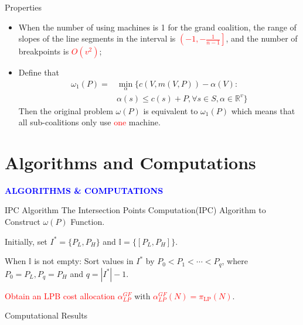 \documentclass[14pt]{beamer}
\begin{document}
\begin{frame}{Properties}
	\vspace{-1mm}
		\begin{itemize}
		\justifying
			\item When the number of using machines is 1 for the grand coalition, the range of slopes of the line segments in the interval is \textcolor{red}{$\left( -1 , -\frac{1}{n-1} \right]$}, and the number of breakpoints is \textcolor{red}{$ O(v^2)$};
			\pause
			\item Define that
			\begin{eqnarray*}
			{\omega_1(P)}=&\mathop{\min}_{\alpha}\{c(V,m(V,P))-\alpha(V): \\
			&\alpha(s)\leq c(s)+P,\forall s \in S, \alpha\in\mathbb{R}^{v}\}
			\end{eqnarray*}
			Then the original problem $\omega(P)$ is equivalent to $\omega_1(P)$ which means that all sub-coalitions only use \textcolor{red}{one} machine.

	\end{itemize}
\end{frame}

\section{Algorithms and Computations}
\begin{frame}
\centering
\large
\textcolor{blue}{\bf {\huge A}LGORITHMS \&  {\huge C}OMPUTATIONS}
\end{frame}

\begin{frame}{IPC Algorithm}
	The Intersection Points Computation(IPC) Algorithm to Construct $\omega(P)$ Function.
	\begin{description}
	\justifying
	\footnotesize
		\item[Step 1.] Initially, set $I^*=\{P_L,P_H\}$ and $\mathbb{I}= \{[P_L,P_H]\}$.
		\item[Step 2.] When $\mathbb{I}$ is not empty: Sort values in $I^*$ by $P_0<P_1<\cdots<P_q$, where $P_0 = P_L,P_q = P_H$ and $q = |I^*|-1$.
		\item[Step 3.] \textcolor{red}{Obtain an LPB cost allocation $\alpha^{GF}_{LP}$} with \textcolor{red}{$\alpha^{GF}_{LP}(N) = \pi_{\mathrm{LP}}(N)$}.
	\end{description}

\end{frame}

\begin{frame}{Computational Results}

\end{frame}
\end{document}
